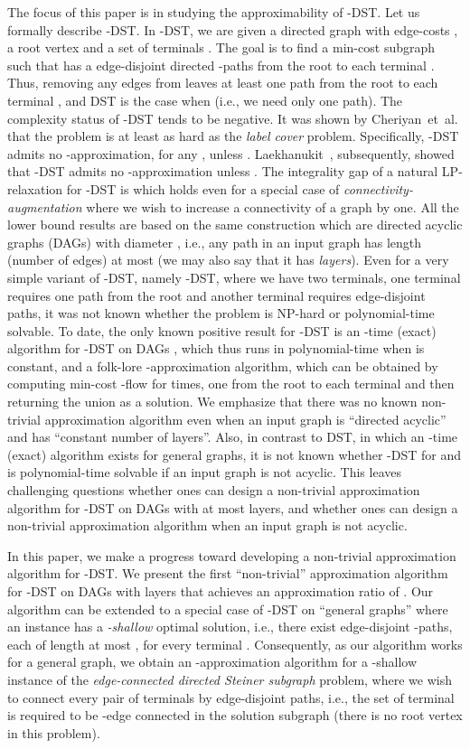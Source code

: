 \documentclass[11pt]{article}
\theoremstyle{definition}
\theoremstyle{remark}
\begin{document}
The focus of this paper is in studying the approximability of -DST.
Let us formally describe -DST. 
In -DST, we are given a directed graph  with edge-costs
, a root vertex  and 
a set of terminals .
The goal is to find a min-cost subgraph  such that
 has a  edge-disjoint directed -paths from the root  to
each terminal . 
Thus, removing any  edges from  leaves at least one path from
the root  to each terminal ,
and DST is the case when  (i.e., we need only one path).
The complexity status of -DST tends to be negative. 
It was shown by Cheriyan~et~al. \cite{CheriyanLNV14} that
the problem is at least as hard as the {\em label cover} problem.
Specifically, -DST admits no
-approximation, for any ,
unless .
Laekhanukit~\cite{Laekhanukit14}, subsequently, showed that
-DST admits no -approximation 
unless .
The integrality gap of a natural LP-relaxation for -DST is
 which holds even for a special case of 
{\em connectivity-augmentation} where we wish to increase 
a connectivity of a graph by one.
All the lower bound results are based on the same construction
which are directed acyclic graphs (DAGs) with diameter , i.e.,
any path in an input graph has length (number of edges) at most 
(we may also say that it has {\em  layers}).
Even for a very simple variant of -DST, namely -DST, 
where we have two terminals,
one terminal requires one path from the root and 
another terminal requires  edge-disjoint paths, 
it was not known whether the problem is NP-hard or 
polynomial-time solvable.
To date, the only known positive result for -DST is 
an -time (exact) algorithm  for -DST on DAGs
\cite{CheriyanLNV14}, which thus runs in polynomial-time when  is  
constant,
and a folk-lore -approximation algorithm, which can
be obtained by computing min-cost -flow for  times, 
one from the root  to each terminal 
and then returning the union as a solution.
We emphasize that there was no known non-trivial approximation
algorithm even when an input graph is ``directed acyclic'' and 
has ``constant number of layers''.
Also, in contrast to DST, in which an -time
(exact) algorithm exists for general graphs,
it is not known whether -DST for  and  is
polynomial-time solvable if an input graph is not acyclic.
This leaves challenging questions whether ones can design a non-trivial 
approximation algorithm for -DST on DAGs with at most  layers,
and whether ones can design a non-trivial approximation algorithm
when an input graph is not acyclic.

In this paper, we make a progress toward developing a non-trivial
approximation algorithm for -DST.
We present the first ``non-trivial'' approximation algorithm for
-DST on DAGs with  layers that achieves an approximation ratio
of .
Our algorithm can be extended to a special case of -DST 
on ``general graphs'' where an instance has 
a {\em -shallow} optimal solution, i.e., 
there exist  edge-disjoint -paths, each of length at most ,
for every terminal .
Consequently, as our algorithm works for a general graph,
we obtain an -approximation
algorithm for a -shallow instance of 
the {\em  edge-connected directed Steiner subgraph} problem, where  
we wish to connect every pair of terminals by  edge-disjoint paths,
i.e., the set of terminal  is required to be -edge connected in
the solution subgraph (there is no root vertex in this problem).
\end{document}
